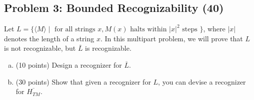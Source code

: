 \documentclass{article}
\begin{document}
\subsection*{Problem 3: Bounded Recognizability (40)}
Let $L = \{ \langle M \rangle \mid \text{ for all strings } x, M(x) \text{ halts within } |x|^2 \text { steps } \}$, where $|x|$ 
denotes the length of a string $x$.
In this multipart problem, we will prove that $L$ is not recognizable, but $\overline{L}$ is recognizable.
\begin{enumerate}[(a)]
  \item (10 points) Design a recognizer for $\overline{L}$.
  \item (30 points) Show that given a recognizer for $L$, you can devise a recognizer for $\overline{H_{TM}}$.
\end{enumerate}
\end{document}
